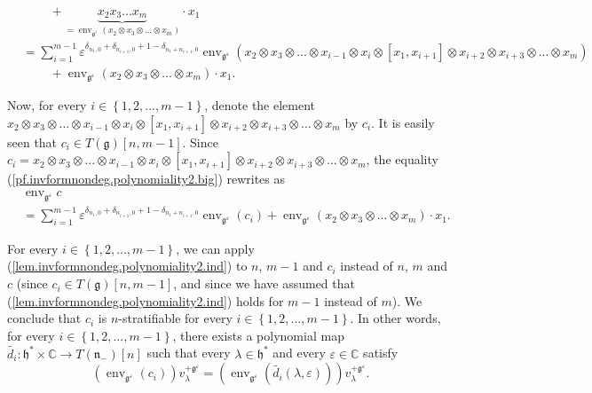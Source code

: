 \documentclass
[numbers=enddot,12pt,final,onecolumn,german,notitlepage]{scrartcl}%
\theoremstyle{definition}
\begin{document}
\begin{align}
&  \ \ \ \ \ \ \ \ \ \ +\underbrace{x_{2}x_{3}...x_{m}}_{=\operatorname*{env}%
\nolimits_{\mathfrak{g}^{\varepsilon}}\left(  x_{2}\otimes x_{3}%
\otimes...\otimes x_{m}\right)  }\cdot x_{1}\nonumber\\
&  =\sum\limits_{i=1}^{m-1}\varepsilon^{\delta_{n_{1},0}+\delta_{n_{i+1}%
,0}+1-\delta_{n_{1}+n_{i+1},0}}\operatorname*{env}\nolimits_{\mathfrak{g}%
^{\varepsilon}}\left(  x_{2}\otimes x_{3}\otimes...\otimes x_{i-1}\otimes
x_{i}\otimes\left[  x_{1},x_{i+1}\right]  \otimes x_{i+2}\otimes
x_{i+3}\otimes...\otimes x_{m}\right) \nonumber\\
&  \ \ \ \ \ \ \ \ \ \ +\operatorname*{env}\nolimits_{\mathfrak{g}%
^{\varepsilon}}\left(  x_{2}\otimes x_{3}\otimes...\otimes x_{m}\right)  \cdot
x_{1}. \label{pf.invformnondeg.polynomiality2.big}%
\end{align}


Now, for every $i\in\left\{  1,2,...,m-1\right\}  $, denote the element
$x_{2}\otimes x_{3}\otimes...\otimes x_{i-1}\otimes x_{i}\otimes\left[
x_{1},x_{i+1}\right]  \otimes x_{i+2}\otimes x_{i+3}\otimes...\otimes x_{m}$
by $c_{i}$. It is easily seen that $c_{i}\in T\left(  \mathfrak{g}\right)
\left[  n,m-1\right]  $. Since \newline$c_{i}=x_{2}\otimes x_{3}%
\otimes...\otimes x_{i-1}\otimes x_{i}\otimes\left[  x_{1},x_{i+1}\right]
\otimes x_{i+2}\otimes x_{i+3}\otimes...\otimes x_{m}$, the equality
(\ref{pf.invformnondeg.polynomiality2.big}) rewrites as%
\begin{align}
&  \operatorname*{env}\nolimits_{\mathfrak{g}^{\varepsilon}}c\nonumber\\
&  =\sum\limits_{i=1}^{m-1}\varepsilon^{\delta_{n_{1},0}+\delta_{n_{i+1}%
,0}+1-\delta_{n_{1}+n_{i+1},0}}\operatorname*{env}\nolimits_{\mathfrak{g}%
^{\varepsilon}}\left(  c_{i}\right)  +\operatorname*{env}%
\nolimits_{\mathfrak{g}^{\varepsilon}}\left(  x_{2}\otimes x_{3}%
\otimes...\otimes x_{m}\right)  \cdot x_{1}.
\label{pf.invformnondeg.polynomiality2.small}%
\end{align}


For every $i\in\left\{  1,2,...,m-1\right\}  $, we can apply
(\ref{lem.invformnondeg.polynomiality2.ind}) to $n$, $m-1$ and $c_{i}$ instead
of $n$, $m$ and $c$ (since $c_{i}\in T\left(  \mathfrak{g}\right)  \left[
n,m-1\right]  $, and since we have assumed that
(\ref{lem.invformnondeg.polynomiality2.ind}) holds for $m-1$ instead of $m$).
We conclude that $c_{i}$ is $n$-stratifiable for every $i\in\left\{
1,2,...,m-1\right\}  $. In other words, for every $i\in\left\{
1,2,...,m-1\right\}  $, there exists a polynomial map $\widetilde{d_{i}%
}:\mathfrak{h}^{\ast}\times\mathbb{C}\rightarrow T\left(  \mathfrak{n}%
_{-}\right)  \left[  n\right]  $ such that every $\lambda\in\mathfrak{h}%
^{\ast}$ and every $\varepsilon\in\mathbb{C}$ satisfy%
\[
\left(  \operatorname*{env}\nolimits_{\mathfrak{g}^{\varepsilon}}\left(
c_{i}\right)  \right)  v_{\lambda}^{+\mathfrak{g}^{\varepsilon}}=\left(
\operatorname*{env}\nolimits_{\mathfrak{g}^{\varepsilon}}\left(
\widetilde{d_{i}}\left(  \lambda,\varepsilon\right)  \right)  \right)
v_{\lambda}^{+\mathfrak{g}^{\varepsilon}}.
\]
\end{document}
